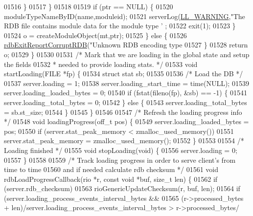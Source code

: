 \begin{DoxyCode}
{{{{{{{{{{{{{{{{{{{{{{{{{01516             \}
01517         \}
01518 
01519         \textcolor{keywordflow}{if} (ptr == NULL) \{
01520             moduleTypeNameByID(name,moduleid);
01521             serverLog(\hyperlink{server_8h_a31229b9334bba7d6be2a72970967a14b}{LL\_WARNING},\textcolor{stringliteral}{"The RDB file contains module data for the module type
       '%
      ;
01522             exit(1);
01523         \}
01524         o = createModuleObject(mt,ptr);
01525     \} \textcolor{keywordflow}{else} \{
01526         \hyperlink{rdb_8c_afb34e310c0e5dfd9f8c2bebbec59c7f7}{rdbExitReportCorruptRDB}(\textcolor{stringliteral}{"Unknown RDB encoding type %
01527     \}
01528     \textcolor{keywordflow}{return} o;
01529 \}
01530 
01531 \textcolor{comment}{/* Mark that we are loading in the global state and setup the fields}
01532 \textcolor{comment}{ * needed to provide loading stats. */}
01533 \textcolor{keywordtype}{void} startLoading(FILE *fp) \{
01534     \textcolor{keyword}{struct} stat sb;
01535 
01536     \textcolor{comment}{/* Load the DB */}
01537     server.loading = 1;
01538     server.loading\_start\_time = time(NULL);
01539     server.loading\_loaded\_bytes = 0;
01540     \textcolor{keywordflow}{if} (fstat(fileno(fp), &sb) == -1) \{
01541         server.loading\_total\_bytes = 0;
01542     \} \textcolor{keywordflow}{else} \{
01543         server.loading\_total\_bytes = sb.st\_size;
01544     \}
01545 \}
01546 
01547 \textcolor{comment}{/* Refresh the loading progress info */}
01548 \textcolor{keywordtype}{void} loadingProgress(off\_t pos) \{
01549     server.loading\_loaded\_bytes = pos;
01550     \textcolor{keywordflow}{if} (server.stat\_peak\_memory < zmalloc\_used\_memory())
01551         server.stat\_peak\_memory = zmalloc\_used\_memory();
01552 \}
01553 
01554 \textcolor{comment}{/* Loading finished */}
01555 \textcolor{keywordtype}{void} stopLoading(\textcolor{keywordtype}{void}) \{
01556     server.loading = 0;
01557 \}
01558 
01559 \textcolor{comment}{/* Track loading progress in order to serve client's from time to time}
01560 \textcolor{comment}{   and if needed calculate rdb checksum  */}
01561 \textcolor{keywordtype}{void} rdbLoadProgressCallback(rio *r, \textcolor{keyword}{const} \textcolor{keywordtype}{void} *buf, size\_t len) \{
01562     \textcolor{keywordflow}{if} (server.rdb\_checksum)
01563         rioGenericUpdateChecksum(r, buf, len);
01564     \textcolor{keywordflow}{if} (server.loading\_process\_events\_interval\_bytes &&
01565         (r->processed\_bytes + len)/server.loading\_process\_events\_interval\_bytes > r->processed\_bytes/
}}}}}}}}}}}}}}}}}}}}}}}}}}}
\end{DoxyCode}
